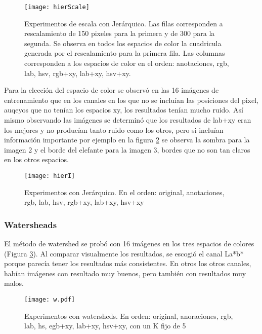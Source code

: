 \documentclass[10pt,twocolumn,letterpaper]{article}
\begin{document}
\begin{figure}[t]
    \texttt{[image: hierScale]}
    \caption{Experimentos de escala con Jerárquico. Las filas corresponden a rescalamiento de 150 pixeles para la primera y de 300 para la segunda. Se observa en todos los espacios de color la cuadricula generada por el rescalamiento para la primera fila. Las columnas corresponden a los espacios de color en el orden: anotaciones, rgb, lab, hsv, rgb+xy, lab+xy, hsv+xy.}
\label{fig:tamano}
\end{figure}

Para la elección del espacio de color se observó en las 16 imágenes de entrenamiento que en los canales en los que no se incluían las posiciones del pixel, auqeyos que no tenían los espacios xy, los resultados tenían mucho ruido. Así mismo observando las imágenes se determinó que los resultados de lab+xy eran los mejores y no producían tanto ruido como los otros, pero si incluían información importante por ejemplo en la figura \ref{fig:hier} se observa la sombra para la imagen 2 y el borde del elefante para la imagen 3, bordes que no son tan claros en los otros espacios.

\begin{figure}[t]
    \texttt{[image: hierI]}
    \caption{Experimentos con Jerárquico. En el orden: original, anotaciones, rgb, lab, hsv, rgb+xy, lab+xy, hsv+xy}
\label{fig:hier}
\end{figure}

\subsubsection{Watersheads}
El método de watershed se probó con 16 imágenes en los tres espacios de colores (Figura \ref{fig:w}). Al comparar visualmente los resultados, se escogió el canal La*b* porque parecía tener los resultados más consistentes. En otros los otros canales, habían imágenes con resultado muy buenos, pero también con resultados muy malos. 

\begin{figure}[t]
\begin{center}
   \texttt{[image: w.pdf]}
\end{center}
   \caption{Experimentos con watersheds. En orden: original, anoraciones, rgb, lab, hs, egb+xy, lab+xy, hsv+xy, con un K fijo de 5}
\label{fig:w}
\end{figure}
\end{document}
